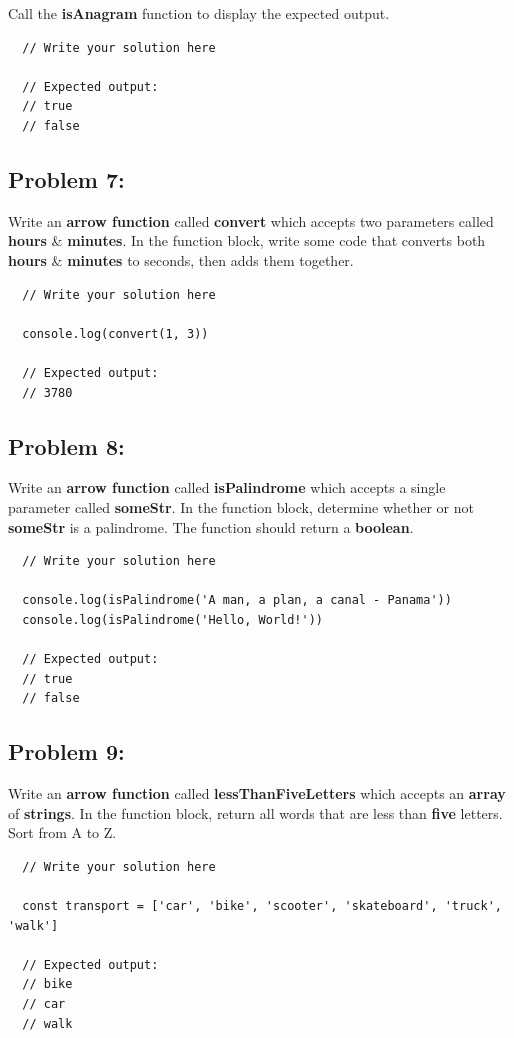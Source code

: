 \documentclass{article}
\begin{document}
Call the \textbf{isAnagram} function to display the expected output.

\begin{verbatim}
  // Write your solution here

  // Expected output:
  // true
  // false
\end{verbatim}

\subsection*{Problem 7:}
Write an \textbf{arrow function} called \textbf{convert} which accepts two parameters called \textbf{hours} \& \textbf{minutes}. In the function block, write some code that converts both \textbf{hours} \& \textbf{minutes} to seconds, then adds them together.

\begin{verbatim}
  // Write your solution here

  console.log(convert(1, 3))

  // Expected output:
  // 3780
\end{verbatim}

\subsection*{Problem 8:}
Write an \textbf{arrow function} called \textbf{isPalindrome} which accepts a single parameter called \textbf{someStr}. In the function block, determine whether or not \textbf{someStr} is a palindrome. The function should return a \textbf{boolean}.

\begin{verbatim}
  // Write your solution here

  console.log(isPalindrome('A man, a plan, a canal - Panama'))
  console.log(isPalindrome('Hello, World!'))

  // Expected output:
  // true
  // false
\end{verbatim}
 
\subsection*{Problem 9:}
Write an \textbf{arrow function} called \textbf{lessThanFiveLetters} which accepts an \textbf{array} of \textbf{strings}. In the function block, return all words that are less than \textbf{five} letters. Sort from A to Z.

\begin{verbatim} 
  // Write your solution here

  const transport = ['car', 'bike', 'scooter', 'skateboard', 'truck', 'walk']

  // Expected output:
  // bike
  // car
  // walk
\end{verbatim}
\end{document}
